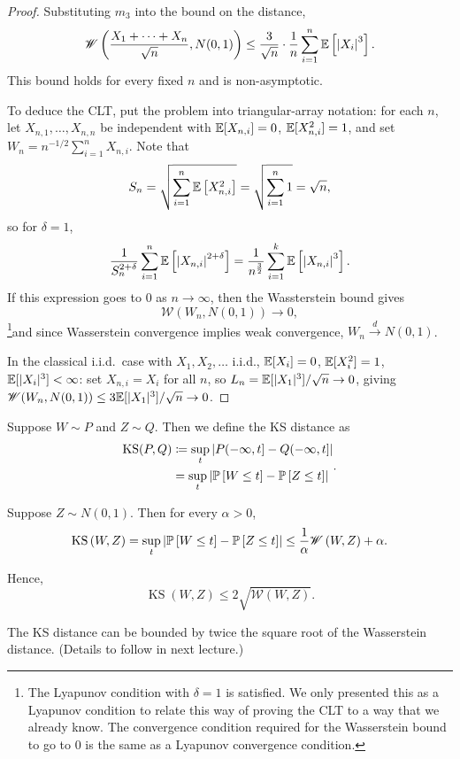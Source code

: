 \begin{proof}
	Substituting $m_3$ into the bound on the distance, \[
		\mathscr{W}\left( \frac{X_1 + \cdots + X_n}{\sqrt{n} }, N(0,1) \right) \le \frac{3}{\sqrt{n} } \cdot \frac{1}{n} \sum\limits_{i=1}^{n} \E\left[\left| X_i \right|^3\right]
	.\]
	This bound holds for every fixed $n$ and is non-asymptotic.

	To deduce the CLT, put the problem into triangular-array notation: for each $n$, let $X_{n,1},\ldots,X_{n,n}$ be independent with $\E[X_{n,i}]=0$, $\E[X_{n,i}^2]=1$, and set $W_n = n^{-1/2}\sum_{i=1}^n X_{n,i}$. Note that \[
		S_n = \sqrt{\sum\limits_{i=1}^{n} \E\left[X_{n,i}^2\right] } = \sqrt{\sum\limits_{i=1}^{n} 1} = \sqrt{n} 
	,\] so for $\delta = 1$, \[
		\frac{1}{S_n^{2+ \delta}} \sum\limits_{i=1}^{n} \E\left[\left| X_{n,i} \right|^{2+\delta}\right] = \frac{1}{n^{\frac{3}{2}}} \sum\limits_{i=1}^{k} \E\left[\left| X_{n,i} \right|^3\right]
	.\] If this expression goes to $0$ as $n\to \infty$, then the Wassterstein bound gives \[
		\mathscr{W}\left( W_n ,N(0,1) \right) \to 0
	,\] \footnote{The Lyapunov condition with $\delta=1$ is satisfied. We only presented this as a Lyapunov condition to relate this way of proving the CLT to a way that we already know. The convergence condition required for the Wasserstein bound to go to $0$ is the same as a Lyapunov convergence condition.}and since Wasserstein convergence implies weak convergence, $W_n \xrightarrow{d} N(0,1)$.

	In the classical i.i.d.\ case with $X_1,X_2,\ldots$ i.i.d., $\E[X_i]=0$, $\E[X_i^2]=1$, $\E[|X_i|^3]<\infty$: set $X_{n,i}=X_i$ for all $n$, so $L_n = \E[|X_1|^3]/\sqrt{n} \to 0$, giving $\mathscr{W}(W_n, N(0,1)) \le 3\E[|X_1|^3]/\sqrt{n} \to 0$.
\end{proof}

\begin{definition}
	Suppose $W \sim P$ and $Z \sim Q$. Then we define the KS distance as
	\[
		\begin{aligned}
			\operatorname{KS}(P,Q)
			&\coloneqq \sup_t \left| P (-\infty,t] - Q(-\infty,t] \right| \\
			&= \sup_t \left| \P\left[W \le t\right]  - \P\left[Z \le t\right]  \right|
		\end{aligned}
	.\] 
\end{definition}

\begin{proposition}
	Suppose $Z \sim N(0,1)$. Then for every $\alpha > 0$,
	\[
		\operatorname{KS}\left( W, Z \right) = \sup_t \left| \P\left[W \le t\right] - \P\left[Z \le t\right]  \right| \le \frac{1}{\alpha} \mathscr{W}\left( W,Z \right) + \alpha
	.\]

	Hence, \[
		\operatorname{KS}\left( W, Z \right) \le 2 \sqrt{\mathscr{W}(W,Z)} 
	.\] 
	
	The KS distance can be bounded by twice the square root of the Wasserstein distance. (Details to follow in next lecture.)
\end{proposition}

